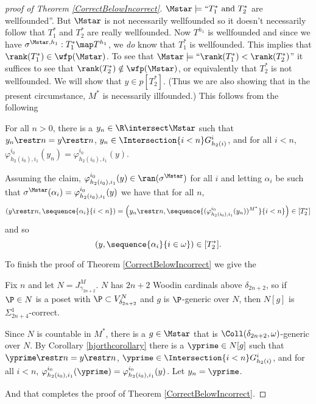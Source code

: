 \documentclass[oneside,12pt]{amsart}
\begin{document}
\begin{proof}[proof of Theorem \ref{CorrectBelowIncorrect}]
$\Mstar\models \text{``}T_1^* \text{ and } T_2^*$ are wellfounded''. But $\Mstar$ is not
necessarily wellfounded so it doesn't necessarily follow that $T_1^*$ and $T_2^*$ are really wellfounded.
Now $T^{h_1}$ is wellfounded and since we have $\sigma^{\Mstar,h_1}:T_1^*\map T^{h_1}$,
we \emph{do} know that $T_1^*$ is wellfounded. This implies that
$\rank(T_1^*)\in\wfp(\Mstar)$.
To see that $\Mstar\models\text{``}\rank(T_1^*) < \rank(T_2^*)$'' it suffices to
see that $\rank(T_2^*)\notin\wfp(\Mstar)$, or equivalently that $T_2^*$ is not wellfounded.
We will show that $y\in p[T_2^*]$. (Thus we are also showing that in the present
circumstance, $M^*$ is necessarily illfounded.)
This follows from the following

\begin{claim}
For all $n>0$, there is a $y_n\in \R\intersect\Mstar$ such that $y_n\restr n = y \restr n$,
$y_n \in  \Intersection{i<n} G^i_{h_2(i)}$,
and for all $i < n$, $\varphi^{i_0}_{h_2(i_0),i_1}(y_n) = \varphi^{i_0}_{h_2(i_0),i_1}(y)$.
\end{claim}

Assuming the claim, $\varphi^{i_0}_{h_2(i_0),i_1}(y)\in\ran(\sigma^{\Mstar})$ for all $i$
and letting $\alpha_i$ be such that $\sigma^{\Mstar}(\alpha_i)=\varphi^{i_0}_{h_2(i_0),i_1}(y)$
we have that for all $n$,
$$\left(y\restr n, \sequence{\alpha_i}{i<n} \right)=
\left(y_n\restr n, \sequence{(\varphi^{i_0}_{h_2(i_0),i_1}(y_n))^{M^*}}{i<n} \right)\in[T^*_2]$$
and so
$$\left(y, \sequence{\alpha_i}{i\in\omega} \right)\in[T^*_2].$$

To finish the proof of Theorem \ref{CorrectBelowIncorrect} we give the

\begin{subproof}
Fix $n$ and let $N=J^M_{\gamma_{2n+2}}$. $N$ has $2n+2$ Woodin cardinals above $\delta_{2n+2}$,
so if $\P\in N$ is a poset with $\P\subset V^N_{\delta_{2n+2}}$ and $g$ is $\P$-generic over $N$, then $N[g]$
is $\Sigma^1_{2n+4}$-correct.

Since $N$ is countable in $M^*$, there is a $g\in\Mstar$ that is
$\Coll(\delta_{2n+2},\omega)$-generic over $N$. By Corollary \ref{hjorthcorollary}
there is a $\yprime\in N[g]$ such that
$\yprime\restr n = y \restr n$,
$\yprime \in  \Intersection{i<n} G^i_{h_2(i)}$,
and for all $i < n$, $\varphi^{i_0}_{h_2(i_0),i_1}(\yprime) = \varphi^{i_0}_{h_2(i_0),i_1}(y)$.
Let $y_n=\yprime$.

\end{subproof}

And that completes the proof of Theorem \ref{CorrectBelowIncorrect}.

\end{proof}
\end{document}
